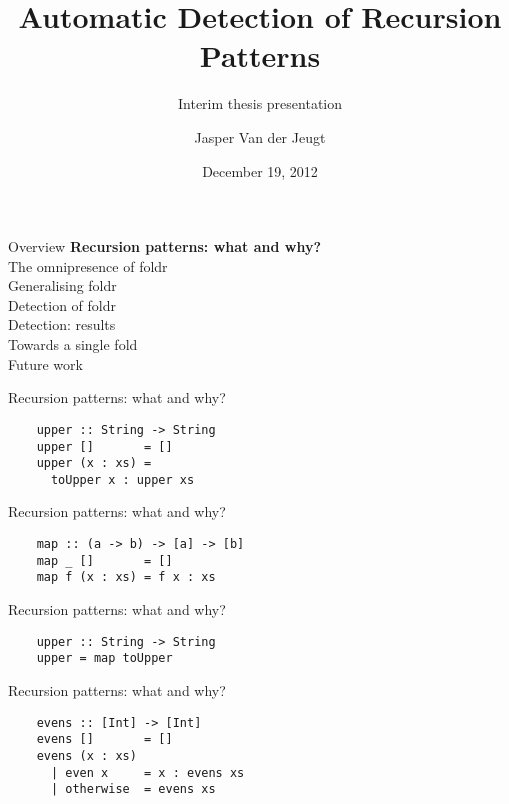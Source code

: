 \documentclass[20pt]{beamer}
\begin{document}
\title{Automatic Detection of Recursion Patterns}
\subtitle{Interim thesis presentation}
\author{Jasper Van der Jeugt}
\date{December 19, 2012}

\begin{frame}[plain]
    \titlepage
\end{frame}


\begin{frame}{Overview}
    \textbf{Recursion patterns: what and why?} \\
    The omnipresence of foldr \\
    Generalising foldr \\
    Detection of foldr \\
    Detection: results \\
    Towards a single fold \\
    Future work \\
\end{frame}

\begin{frame}[fragile]{Recursion patterns: what and why?}
    \begin{lstlisting}
    upper :: String -> String
    upper []       = []
    upper (x : xs) =
      toUpper x : upper xs
    \end{lstlisting}
\end{frame}

\begin{frame}[fragile]{Recursion patterns: what and why?}
    \begin{lstlisting}
    map :: (a -> b) -> [a] -> [b]
    map _ []       = []
    map f (x : xs) = f x : xs
    \end{lstlisting}
\end{frame}

\begin{frame}[fragile]{Recursion patterns: what and why?}
    \begin{lstlisting}
    upper :: String -> String
    upper = map toUpper
    \end{lstlisting}
\end{frame}

\begin{frame}[fragile]{Recursion patterns: what and why?}
    \begin{lstlisting}
    evens :: [Int] -> [Int]
    evens []       = []
    evens (x : xs)
      | even x     = x : evens xs
      | otherwise  = evens xs
    \end{lstlisting}
\end{frame}
\end{document}
